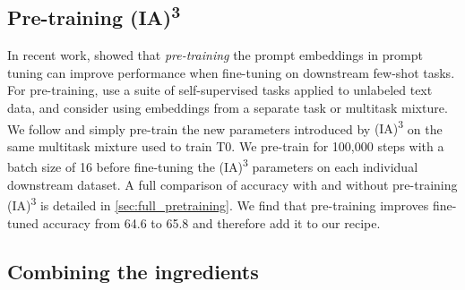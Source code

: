 \begin{minipage}[r]{0.48\textwidth}

\centering

\label{fig:peft}
\end{minipage}

\hfill

\begin{minipage}[r]{0.48\textwidth}

\centering


\label{fig:main}
\end{minipage}

\subsection{Pre-training {\selectfont (IA)\textsuperscript{3}}}

In recent work, \citet{gu2021ppt,vu2021spot} showed that \textit{pre-training} the prompt embeddings in prompt tuning can improve performance when fine-tuning on downstream few-shot tasks. For pre-training, \citet{gu2021ppt} use a suite of self-supervised tasks applied to unlabeled text data, and \citet{vu2021spot} consider using embeddings from a separate task or multitask mixture. We follow \citet{vu2021spot} and simply pre-train the new parameters introduced by {\selectfont (IA)\textsuperscript{3}} on the same multitask mixture used to train T0. We pre-train for 100,000 steps with a batch size of 16 before fine-tuning the {\selectfont (IA)\textsuperscript{3}} parameters on each individual downstream dataset. A full comparison of accuracy with and without pre-training {\selectfont (IA)\textsuperscript{3}} is detailed in \ref{sec:full_pretraining}.
We find that pre-training improves fine-tuned accuracy from 64.6 to 65.8 and therefore add it to our recipe.

\subsection{Combining the ingredients}

